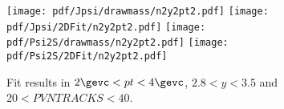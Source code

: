 \begin{figure}[H]
\begin{center}
\texttt{[image: pdf/Jpsi/drawmass/n2y2pt2.pdf]}
\texttt{[image: pdf/Jpsi/2DFit/n2y2pt2.pdf]}
\vspace*{-0.5cm}
\texttt{[image: pdf/Psi2S/drawmass/n2y2pt2.pdf]}
\texttt{[image: pdf/Psi2S/2DFit/n2y2pt2.pdf]}
\vspace*{-0.5cm}
\end{center}
\caption{Fit results in $2\gevc<pt<4\gevc$, $2.8<y<3.5$ and $20<PVNTRACKS<40$.}
\label{Fitn2y2pt2}
\end{figure}
